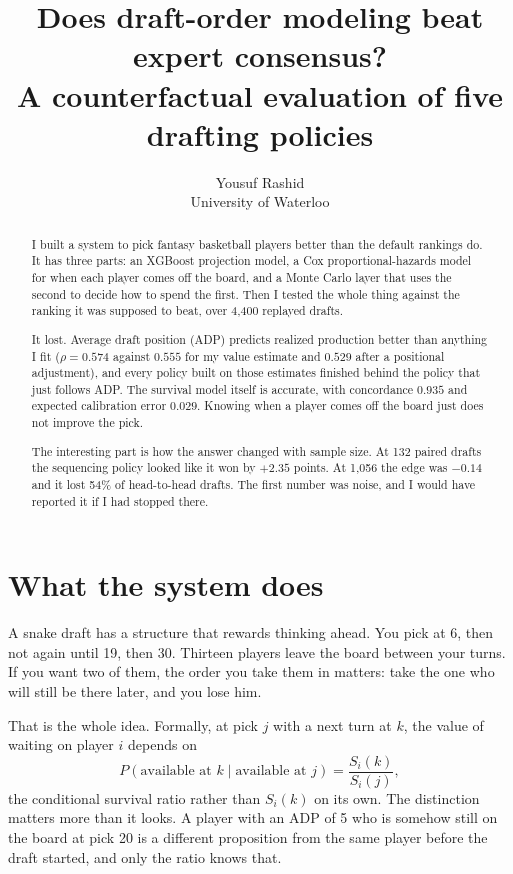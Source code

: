 \documentclass[11pt]{article}
\title{Does draft-order modeling beat expert consensus?\\
\large A counterfactual evaluation of five drafting policies}
\author{Yousuf Rashid\\ \small University of Waterloo}
\date{}
\begin{document}
\maketitle

\begin{abstract}
\noindent
I built a system to pick fantasy basketball players better than the default
rankings do. It has three parts: an XGBoost projection model, a Cox
proportional-hazards model for when each player comes off the board, and a Monte
Carlo layer that uses the second to decide how to spend the first. Then I tested
the whole thing against the ranking it was supposed to beat, over 4{,}400
replayed drafts.

It lost. Average draft position (ADP) predicts realized production better than
anything I fit ($\rho = 0.574$ against $0.555$ for my value estimate and $0.529$
after a positional adjustment), and every policy built on those estimates
finished behind the policy that just follows ADP. The survival model itself is
accurate, with concordance $0.935$ and expected calibration error $0.029$.
Knowing when a player comes off the board just does not improve the pick.

The interesting part is how the answer changed with sample size. At 132 paired
drafts the sequencing policy looked like it won by $+2.35$ points. At 1{,}056 the
edge was $-0.14$ and it lost 54\% of head-to-head drafts. The first number was
noise, and I would have reported it if I had stopped there.
\end{abstract}

\section{What the system does}

A snake draft has a structure that rewards thinking ahead. You pick at 6, then
not again until 19, then 30. Thirteen players leave the board between your turns.
If you want two of them, the order you take them in matters: take the one who
will still be there later, and you lose him.

That is the whole idea. Formally, at pick $j$ with a next turn at $k$, the value
of waiting on player $i$ depends on
\[
P(\text{available at } k \mid \text{available at } j)
= \frac{S_i(k)}{S_i(j)},
\]
the conditional survival ratio rather than $S_i(k)$ on its own. The distinction
matters more than it looks. A player with an ADP of 5 who is somehow still on the
board at pick 20 is a different proposition from the same player before the draft
started, and only the ratio knows that.
\end{document}
